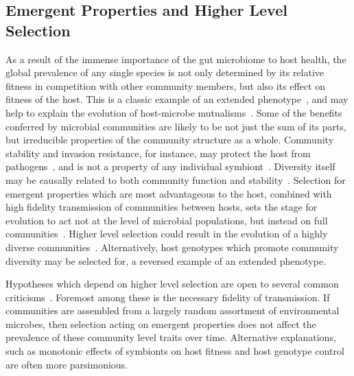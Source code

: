 \documentclass[12pt]{article}
\begin{document}
\subsection{Emergent Properties and Higher Level Selection}
As a result of the immense importance of the gut microbiome to host health,
the global prevalence of any single species is not only determined by its
relative fitness in competition with other community members,
but also its effect on fitness of the host.
This is a classic example of an extended phenotype~\citep{Dawkins1982},
and may help to explain the evolution of host-microbe mutualisms~\citep{Dethlefsen2007a}.
Some of the benefits conferred by microbial communities
are likely to be not just the sum of its parts,
but irreducible properties of the community structure as a whole.
Community stability and invasion resistance, for instance, may protect the
host from pathogens~\citep{TODO}, and is not a property of any individual symbiont~\citep{TODO}.
Diversity itself may be causally related to both community function and
stability~\citep[reviewed in][]{McCann2000}.
Selection for emergent properties which are most advantageous to the host,
combined with high fidelity transmission of communities between hosts,
sets the stage for evolution to act not at the level of microbial populations,
but instead on full communities~\citep{TODO}.
Higher level selection could result in the evolution of a highly diverse
communities~\citep{Hutchinson1959}.
Alternatively, host genotypes which promote community diversity may be
selected for,
a reversed example of an extended phenotype.

Hypotheses which depend on higher level selection are open to several common
criticisms~\citep{TODO}.
Foremost among these is the necessary fidelity of transmission.
If communities are assembled from a largely random assortment of environmental
microbes,
then selection acting on emergent properties does not affect the prevalence
of these community level traits over time.
Alternative explanations, such as monotonic effects of symbionts on host
fitness and host genotype control are often more parsimonious.
\end{document}
